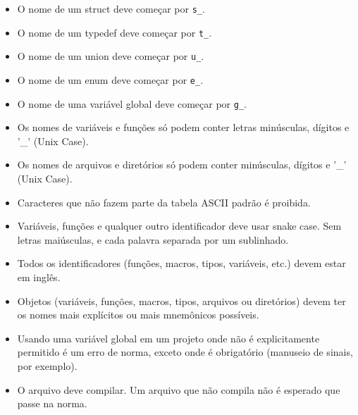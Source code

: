 \documentclass{42-pt}
\begin{document}
        \begin{itemize}

            \item O nome de um struct deve começar por
                \texttt{s\_}.

            \item O nome de um typedef deve começar por
                \texttt{t\_}.

            \item O nome de um union deve começar por \texttt{u\_}.

            \item O nome de um enum deve começar por \texttt{e\_}.

            \item O nome de uma variável global deve começar por \texttt{g\_}.

            \item Os nomes de variáveis e funções só podem conter letras minúsculas,
             dígitos e '\_' (Unix Case).

            \item Os nomes de arquivos e diretórios só podem conter minúsculas, dígitos e
                '\_' (Unix Case).

            \item Caracteres que não fazem parte 
                da tabela ASCII padrão é proibida.

            \item Variáveis, funções e qualquer outro identificador deve usar
                snake case. Sem letras maiúsculas, e cada palavra separada por um
                sublinhado.

            \item Todos os identificadores (funções, macros, tipos,
                variáveis, etc.) devem estar em inglês.

            \item Objetos (variáveis, funções, macros, tipos,
                arquivos ou diretórios) devem ter os
                nomes mais explícitos ou mais mnemônicos possíveis.

            \item Usando uma variável global em um projeto onde não é
                explicitamente permitido é um erro de norma, exceto onde é
                obrigatório (manuseio de sinais, por exemplo).

            \item O arquivo deve compilar. Um arquivo que não compila não é esperado
                que passe na norma.
        \end{itemize}
\newpage
\end{document}
